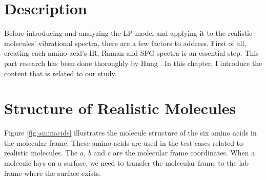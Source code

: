  \label{ch:2}
\section{Description}
Before introducing and analyzing the LP model and applying it to the realistic molecules' vibrational spectra, there are a few factors to address. First of all, creating each amino acid's IR, Raman and SFG spectra is an essential step. This part research has been done thoroughly by Hung \cite{KuoKaiHung:Thesis:2015}. In this chapter, I introduce the content that is related to our study. \\

\section{Structure of Realistic Molecules}
Figure \ref{fig:aminacids} illustrates the molecule structure of the six amino acids in the molecular frame. These amino acids are used in the test cases related to realistic molecules. The $a$, $b$ and $c$ are the molecular frame coordinates. When a molecule lays on a surface, we need to transfer the molecular frame to the lab frame where the surface exists. \\

